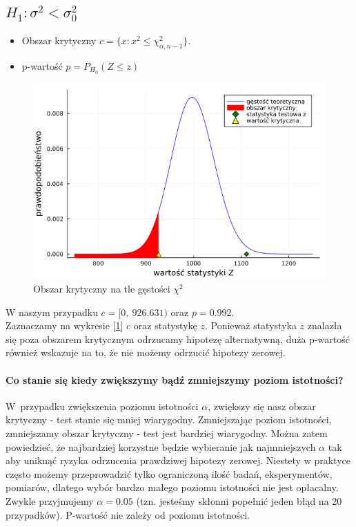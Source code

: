 \documentclass{article}
\theoremstyle{break}
\begin{document}
\subsection{$H_1: \sigma^2  < \sigma^2_0$}
\begin{itemize}
	\item Obszar krytyczny $c=\{x: x^2\leq \chi^2_{\alpha,n-1}\}$.
	\item p-wartość $p=P_{H_0}(Z\leq z)$
\end{itemize}
\begin{figure}[H]
	\begin{center}
		\includegraphics[scale=0.5]{Z2.3.png}
		\caption{Obszar krytyczny na tle gęstości $\chi^2$}
		\label{fig:6}
	\end{center}
\end{figure}
W naszym przypadku $c=[0,~926.631)$ oraz $p=0.992$.\\
Zaznaczamy na wykresie [\ref{fig:6}]  $c$ oraz statystykę $z$. Ponieważ statystyka $z$ znalazła się poza obszarem krytycznym odrzucamy hipotezę alternatywną, duża p-wartość również wskazuje na to, że nie możemy odrzucić hipotezy zerowej.\\ 

\paragraph{Co stanie się kiedy zwiększymy bądź zmniejszymy poziom istotności?} 
W~przypadku zwiększenia poziomu istotności $\alpha$, zwiększy się nasz obszar krytyczny - test stanie się mniej wiarygodny. Zmniejszając poziom istotności, zmniejszamy obszar krytyczny - test jest bardziej wiarygodny. Można zatem powiedzieć, że najbardziej korzystne będzie wybieranie jak najmniejszych $\alpha$ tak aby uniknąć ryzyka odrzucenia prawdziwej hipotezy zerowej. Niestety w praktyce często możemy przeprowadzić tylko ograniczoną ilość badań, eksperymentów, pomiarów, dlatego wybór bardzo małego poziomu istotności nie jest opłacalny. Zwykle przyjmujemy $\alpha=0.05$ (tzn. jesteśmy skłonni popełnić jeden błąd na 20 przypadków). P-wartość nie zależy od poziomu istotności.
\end{document}
